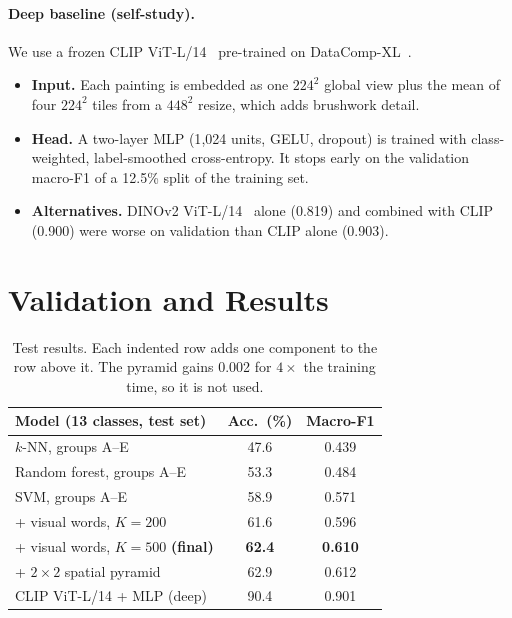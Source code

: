 \documentclass[10pt,twocolumn,a4paper]{article}
\begin{document}
\paragraph{Deep baseline (self-study).}
We use a frozen CLIP ViT-L/14~\cite{radford2021learning,dosovitskiy2021image} pre-trained on DataComp-XL~\cite{gadre2023datacomp}.
\begin{itemize}
\item \textbf{Input.} Each painting is embedded as one $224^2$ global view plus the mean of four $224^2$ tiles from a $448^2$ resize, which adds brushwork detail.
\item \textbf{Head.} A two-layer MLP (1{,}024 units, GELU, dropout) is trained with class-weighted, label-smoothed cross-entropy. It stops early on the validation macro-F1 of a 12.5\% split of the training set.
\item \textbf{Alternatives.} DINOv2 ViT-L/14~\cite{oquab2024dinov2} alone (0.819) and combined with CLIP (0.900) were worse on validation than CLIP alone (0.903).
\end{itemize}

\section{Validation and Results}
\label{sec:results}

\begin{table}[t]
\centering
\small
\begin{tabular}{@{}l c c@{}}
\toprule
Model (13 classes, test set) & Acc.\ (\%) & Macro-F1 \\
\midrule
$k$-NN, groups A--E & 47.6 & 0.439 \\
Random forest, groups A--E & 53.3 & 0.484 \\
SVM, groups A--E & 58.9 & 0.571 \\
\quad + visual words, $K{=}200$ & 61.6 & 0.596 \\
\quad + visual words, $K{=}500$ \textbf{(final)} & \textbf{62.4} & \textbf{0.610} \\
\quad + $2{\times}2$ spatial pyramid & 62.9 & 0.612 \\
\midrule
CLIP ViT-L/14 + MLP (deep) & 90.4 & 0.901 \\
\bottomrule
\end{tabular}
\caption{Test results. Each indented row adds one component to the row above it. The pyramid gains 0.002 for $4\times$ the training time, so it is not used.}
\label{tab:results}
\end{table}
\end{document}
